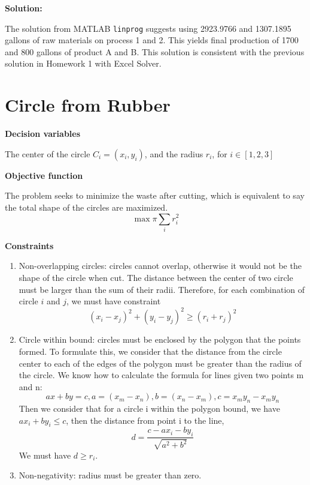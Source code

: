 \textbf{Solution:}\par
The solution from MATLAB \texttt{linprog} suggests using 2923.9766 and 1307.1895 gallons of raw materials on process 1 and 2. This yields final production of 1700 and 800 gallons of product A and B. This solution is consistent with the previous solution in Homework 1 with Excel Solver.

\section{Circle from Rubber}

\textbf{Decision variables}\par
The center of the circle $C_i=(x_i, y_i)$, and the radius $r_i$, for $i \in [1, 2, 3]$

\textbf{Objective function}\par
The problem seeks to minimize the waste after cutting, which is equivalent to say the total shape of the circles are maximized. 
$$
\max \pi\sum_i r_i^2
$$

\textbf{Constraints}
\begin{enumerate}
    \item Non-overlapping circles: circles cannot overlap, otherwise it would not be the shape of the circle when cut. The distance between the center of two circle must be larger than the sum of their radii. Therefore, for each combination of circle $i$ and $j$, we must have constraint
    $$
    (x_i - x_j)^2 + (y_i - y_j)^2 \geq (r_i + r_j)^2
    $$
    
    \item Circle within bound: circles must be enclosed by the polygon that the points formed. To formulate this, we consider that the distance from the circle center to each of the edges of the polygon must be greater than the radius of the circle. We know how to calculate the formula for lines given two points m and n:
    $$
    ax + by = c, a = (x_m - x_n), b = (x_n - x_m), c = x_my_n - x_my_n
    $$
    Then we consider that for a circle i within the polygon bound, we have $ax_i + by_i \leq c$, then the distance from point i to the line,
    $$
    d = \frac{c - ax_i - by_i}{\sqrt{a^2 + b^2}}
    $$
    We must have $d \geq r_i$.
    
    \item Non-negativity: radius must be greater than zero.
\end{enumerate}

